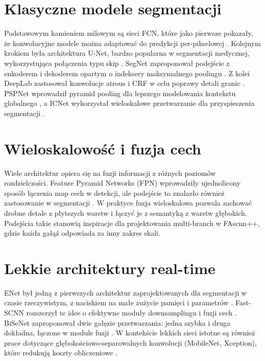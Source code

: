 \documentclass[12pt,oneside,a4paper]{report}
\begin{document}
\section{Klasyczne modele segmentacji}
Podstawowym kamieniem milowym są sieci FCN, które jako pierwsze pokazały, że
konwolucyjne modele można adaptować do predykcji per-pikselowej
\parencite{long2015fully}. Kolejnym krokiem była architektura U-Net, bardzo
popularna w segmentacji medycznej, wykorzystująca połączenia typu skip
\parencite{ronneberger2015u}. SegNet zaproponował podejście z enkoderem i
dekoderem opartym o indeksery maksymalnego poolingu
\parencite{badrinarayanan2017segnet}. Z kolei DeepLab zastosował konwolucje
atrous i CRF w celu poprawy detali granic \parencite{chen2018deeplab}.
PSPNet wprowadził pyramid pooling dla lepszego modelowania kontekstu globalnego
\parencite{zhao2017pspnet}, a ICNet wykorzystał wieloskalowe przetwarzanie dla
przyspieszenia segmentacji \parencite{zhao2018icnet}.

\section{Wieloskalowość i fuzja cech}
Wiele architektur opiera się na fuzji informacji z różnych poziomów
rozdzielczości. Feature Pyramid Networks (FPN) wprowadziły ujednolicony sposób
łączenia map cech w detekcji, ale podejście to znalazło również zastosowanie w
segmentacji \parencite{lin2017fpn}. W praktyce fuzja wieloskalowa pozwala
zachować drobne detale z płytszych warstw i łączyć je z semantyką z warstw
głębokich. Podejścia takie stanowią inspiracje dla projektowania multi-branch
w FAscnn++, gdzie każda gałąź odpowiada za inny zakres skali.

\section{Lekkie architektury real-time}
ENet był jedną z pierwszych architektur zaprojektowanych dla segmentacji w
czasie rzeczywistym, z naciskiem na małe zużycie pamięci i parametrów
\parencite{paszke2016enet}. Fast-SCNN rozszerzył te idee o efektywne moduły
downsamplingu i fuzji cech \parencite{mehta2019fast}. BiSeNet zaproponował dwie
gałęzie przetwarzania: jedna szybka i druga dokładna, łączone w module fuzji
\parencite{yu2018bisenet}. W kontekście lekkich sieci istotne są również prace
dotyczące głębokościowo-separowalnych konwolucji (MobileNet, Xception), które
redukują koszty obliczeniowe \parencite{howard2017mobilenets,chollet2017xception}.
\end{document}
